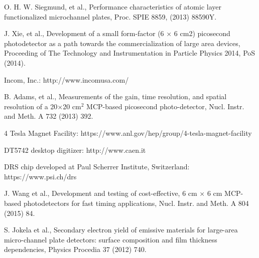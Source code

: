 \documentclass[preprint,5p]{elsarticle}
\begin{document}
\begin{thebibliography}{00}
O. H. W. Siegmund, et al., Performance characteristics of atomic layer 
      functionalized microchannel plates, Proc. SPIE 8859, (2013) 88590Y.

J. Xie, et al., Development of a small form-factor (6 × 6 cm2) picosecond 
photodetector as a path towards the commercialization of large area devices, 
Proceeding of The Technology and Instrumentation in Particle Physics 2014, PoS 
(2014).

Incom, Inc.: http://www.incomusa.com/

B. Adams, et al., Measurements of the gain, time resolution, and spatial 
resolution of a 20$\times$20 cm$^2$ MCP-based picosecond photo-detector, Nucl.  
Instr.  and Meth. A 732 (2013) 392.

4 Tesla Magnet Facility: https://www.anl.gov/hep/group/4-tesla-magnet-facility 

DT5742 desktop digitizer: http://www.caen.it

DRS chip developed at Paul Scherrer Institute, Switzerland: 
https://www.psi.ch/drs

J. Wang et al., Development and testing of cost-effective, 6 cm × 6 cm 
MCP-based photodetectors for fast timing applications, Nucl. Instr. and Meth. A 
804 (2015) 84.

S. Jokela et al., Secondary electron yield of emissive materials for large-area 
micro-channel plate detectors: surface composition and film thickness 
dependencies, Physics Procedia 37 (2012) 740.


\end{thebibliography}
\end{document}
